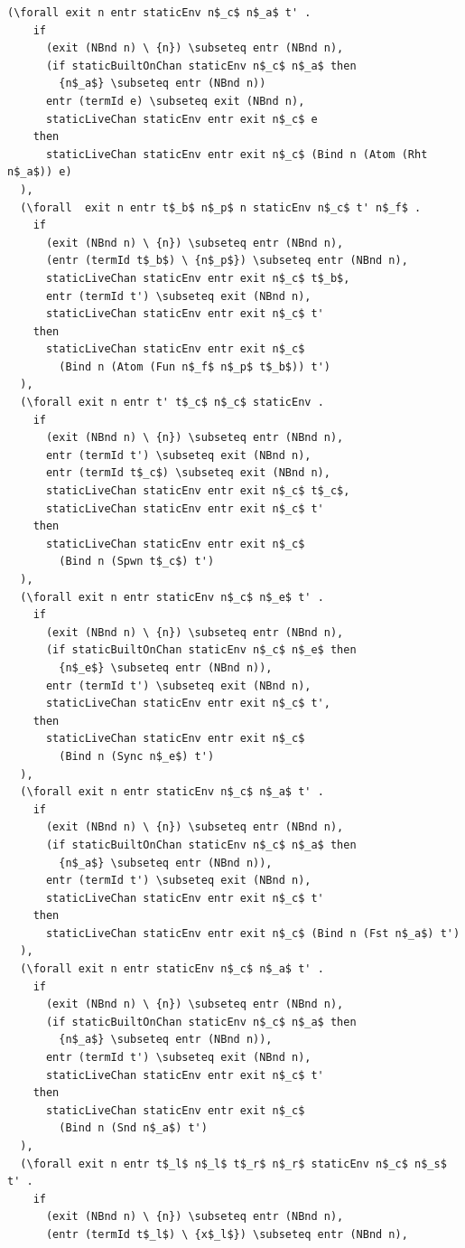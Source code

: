 \documentclass[10pt]{article}
\begin{document}
\begin{lstlisting}[language=logic, mathescape]
  (\forall exit n entr staticEnv n$_c$ n$_a$ t' . 
    if
      (exit (NBnd n) \ {n}) \subseteq entr (NBnd n),
      (if staticBuiltOnChan staticEnv n$_c$ n$_a$ then
        {n$_a$} \subseteq entr (NBnd n))
      entr (termId e) \subseteq exit (NBnd n),
      staticLiveChan staticEnv entr exit n$_c$ e
    then
      staticLiveChan staticEnv entr exit n$_c$ (Bind n (Atom (Rht n$_a$)) e)
  ),
  (\forall  exit n entr t$_b$ n$_p$ n staticEnv n$_c$ t' n$_f$ . 
    if
      (exit (NBnd n) \ {n}) \subseteq entr (NBnd n),
      (entr (termId t$_b$) \ {n$_p$}) \subseteq entr (NBnd n),
      staticLiveChan staticEnv entr exit n$_c$ t$_b$,
      entr (termId t') \subseteq exit (NBnd n),
      staticLiveChan staticEnv entr exit n$_c$ t'
    then
      staticLiveChan staticEnv entr exit n$_c$
        (Bind n (Atom (Fun n$_f$ n$_p$ t$_b$)) t')
  ),
  (\forall exit n entr t' t$_c$ n$_c$ staticEnv .
    if
      (exit (NBnd n) \ {n}) \subseteq entr (NBnd n),
      entr (termId t') \subseteq exit (NBnd n),
      entr (termId t$_c$) \subseteq exit (NBnd n),
      staticLiveChan staticEnv entr exit n$_c$ t$_c$,
      staticLiveChan staticEnv entr exit n$_c$ t'
    then
      staticLiveChan staticEnv entr exit n$_c$
        (Bind n (Spwn t$_c$) t')
  ),
  (\forall exit n entr staticEnv n$_c$ n$_e$ t' .
    if
      (exit (NBnd n) \ {n}) \subseteq entr (NBnd n),
      (if staticBuiltOnChan staticEnv n$_c$ n$_e$ then
        {n$_e$} \subseteq entr (NBnd n)),
      entr (termId t') \subseteq exit (NBnd n),
      staticLiveChan staticEnv entr exit n$_c$ t',
    then
      staticLiveChan staticEnv entr exit n$_c$
        (Bind n (Sync n$_e$) t')
  ),
  (\forall exit n entr staticEnv n$_c$ n$_a$ t' .
    if
      (exit (NBnd n) \ {n}) \subseteq entr (NBnd n),
      (if staticBuiltOnChan staticEnv n$_c$ n$_a$ then
        {n$_a$} \subseteq entr (NBnd n)),
      entr (termId t') \subseteq exit (NBnd n),
      staticLiveChan staticEnv entr exit n$_c$ t'
    then
      staticLiveChan staticEnv entr exit n$_c$ (Bind n (Fst n$_a$) t')
  ),
  (\forall exit n entr staticEnv n$_c$ n$_a$ t' .
    if 
      (exit (NBnd n) \ {n}) \subseteq entr (NBnd n),
      (if staticBuiltOnChan staticEnv n$_c$ n$_a$ then
        {n$_a$} \subseteq entr (NBnd n)),
      entr (termId t') \subseteq exit (NBnd n),
      staticLiveChan staticEnv entr exit n$_c$ t'
    then
      staticLiveChan staticEnv entr exit n$_c$
        (Bind n (Snd n$_a$) t')
  ),
  (\forall exit n entr t$_l$ n$_l$ t$_r$ n$_r$ staticEnv n$_c$ n$_s$ t' .
    if 
      (exit (NBnd n) \ {n}) \subseteq entr (NBnd n),
      (entr (termId t$_l$) \ {x$_l$}) \subseteq entr (NBnd n),

\end{lstlisting}
\end{document}
